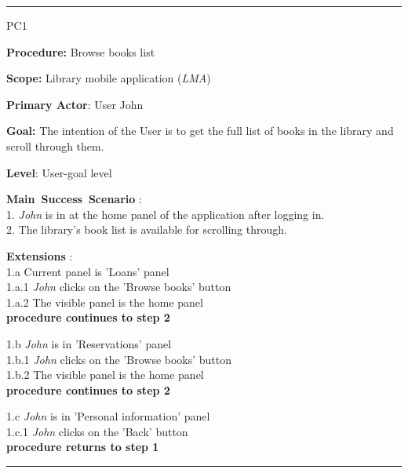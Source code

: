 \vspace{0.5cm}
\hrule
\begin{lyxlist}{PC1}
\small{
\item [\textbf{Procedure:}] Browse books list
\item [\textbf{Scope:}] Library mobile application (\emph{LMA})
\item [\textbf{Primary Actor}:] User John
\item [\textbf{Goal:}] The intention of the User is to get the full list of
books in the library and scroll through them.
\item [\textbf{Level}:] User-goal level
\item [\textbf{Main~Success~Scenario}]:\\
1. \emph{John} is in at the home panel of the application after logging in.\\
2. The library's book list is available for scrolling through.\\


\item [\textbf{Extensions}]:\\
1.a Current panel is 'Loans' panel\\
\hspace*{0.5cm} 1.a.1 \emph{John} clicks on the 'Browse books' button\\
\hspace*{0.5cm} 1.a.2 The visible panel is the home panel\\
\hspace*{0.5cm} \textbf{procedure continues to step 2}

1.b \emph{John} is in 'Reservations' panel\\
\hspace*{0.5cm} 1.b.1 \emph{John} clicks on the 'Browse books' button\\
\hspace*{0.5cm} 1.b.2 The visible panel is the home panel\\
\hspace*{0.5cm} \textbf{procedure continues to step 2}

1.c \emph{John} is in 'Personal information' panel\\
\hspace*{0.5cm} 1.c.1 \emph{John} clicks on the 'Back' button\\
\hspace*{0.5cm} \textbf{procedure returns to step 1}

}


\end{lyxlist}
\hrule

